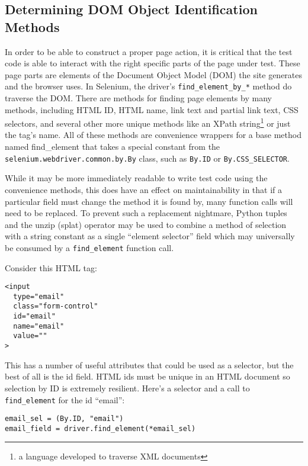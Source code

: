 \subsection{Determining DOM Object Identification Methods}
In order to be able to construct a proper page action, it is critical that the test code is able to interact with the right specific parts of the page under test. These page parts are elements of the Document Object Model (DOM) the site generates and the browser uses. In Selenium, the driver's \texttt{find\_element\_by\_*} method do traverse the DOM. There are methods for finding page elements by many methods, including HTML ID, HTML name, link text and partial link text, CSS selectors, and several other more unique methods like an XPath string\footnote{a language developed to traverse XML documents} or just the tag's name. All of these methods are convenience wrappers for a base method named find\_element that takes a special constant from the \texttt{selenium.webdriver.common.by.By} class, such as \texttt{By.ID} or \texttt{By.CSS\_SELECTOR}.

While it may be more immediately readable to write test code using the convenience methods, this does have an effect on maintainability in that if a particular field must change the method it is found by, many function calls will need to be replaced.\citep{gupta2003dom} To prevent such a replacement nightmare, Python tuples and the unzip (splat) operator may be used to combine a method of selection with a string constant as a single ``element selector'' field which may universally be consumed by a \texttt{find\_element} function call.

Consider this HTML tag:

\begin{Verbatim}[fontsize=\small, baselinestretch=0.75]
<input
  type="email"
  class="form-control"
  id="email"
  name="email"
  value=""
>
\end{Verbatim}

This has a number of useful attributes that could be used as a selector, but the best of all is the id field. HTML ids must be unique in an HTML document \citep{HTMLStan99} so selection by ID is extremely resilient. Here's a selector and a call to \texttt{find\_element} for the id ``email'':

\begin{Verbatim}[fontsize=\small, baselinestretch=0.75]
email_sel = (By.ID, "email")
email_field = driver.find_element(*email_sel)
\end{Verbatim}

